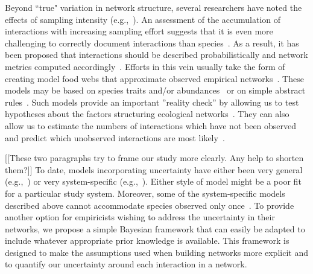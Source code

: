 \documentclass[12pt]{article}
\begin{document}
\begin{spacing}{2.0}
    Beyond ``true" variation in network structure, several researchers have noted the effects of sampling intensity (e.g.,~\citealp{Martinez1999,Bluthgen2006,Bluthgen2007,Jordano2016}). An assessment of the accumulation of interactions with increasing sampling effort suggests that it is even more challenging to correctly document interactions than species~\citep{Guimera2009,Poisot2012,Bartomeus2013,Jordano2016,Giron2018,Graham2018}. As a result, it has been proposed that interactions should be described probabilistically and network metrics computed accordingly~\citep{Bartomeeus2013,Poisot2016}. Efforts in this vein usually take the form of creating model food webs that approximate observed empirical networks~\citep{Allesina2008,Guimera2009,Williams2010,Rohr2016}. These models may be based on species traits and/or abundances~\citep{Rohr2016,Weinstein2017,Weinstein2017a,Graham2018} or on simple abstract rules~\citep{Allesina2008,Guimera2009,Williams2010}. Such models provide an important ''reality check'' by allowing us to test hypotheses about the factors structuring ecological networks~\citep{Bartomeus2013,Weinstein2017.Weinstein2017a,Graham2018}. They can also allow us to estimate the numbers of interactions which have not been observed~\citep{Jordano2016,Weinstein2017a} and predict which unobserved interactions are most likely~\citep{Guimera2009,Bartomeus2013}. 


    [[These two paragraphs try to frame our study more clearly. Any help to shorten them?]]
    To date, models incorporating uncertainty have either been very general (e.g.,~\citet{Guimera2009,Gravel2013}) or very system-specific (e.g.,~\citet{Bartomeus2013,Weinstein2017,Weinstein2017a,Graham2018}). Either style of model might be a poor fit for a particular study system. Moreover, some of the system-specific models described above cannot accommodate species observed only once~\citep{Bartomeus2013,Weinstein2017}. To provide another option for empiricists wishing to address the uncertainty in their networks, we propose a simple Bayesian framework that can easily be adapted to include whatever appropriate prior knowledge is available. This framework is designed to make the assumptions used when building networks more explicit and to quantify our uncertainty around each interaction in a network. 



\end{spacing}
\end{document}
